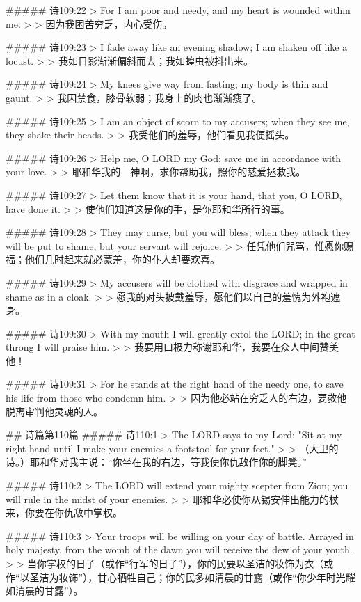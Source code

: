 ##### 诗109:22
> For I am poor and needy, and my heart is wounded within me.
>
> 因为我困苦穷乏，内心受伤。


##### 诗109:23
> I fade away like an evening shadow; I am shaken off like a locust.
>
> 我如日影渐渐偏斜而去；我如蝗虫被抖出来。


##### 诗109:24
> My knees give way from fasting; my body is thin and gaunt.
>
> 我因禁食，膝骨软弱；我身上的肉也渐渐瘦了。


##### 诗109:25
> I am an object of scorn to my accusers; when they see me, they shake their heads.
>
> 我受他们的羞辱，他们看见我便摇头。


##### 诗109:26
> Help me, O LORD my God; save me in accordance with your love.
>
> 耶和华我的　神啊，求你帮助我，照你的慈爱拯救我。


##### 诗109:27
> Let them know that it is your hand, that you, O LORD, have done it.
>
> 使他们知道这是你的手，是你耶和华所行的事。


##### 诗109:28
> They may curse, but you will bless; when they attack they will be put to shame, but your servant will rejoice.
>
> 任凭他们咒骂，惟愿你赐福；他们几时起来就必蒙羞，你的仆人却要欢喜。


##### 诗109:29
> My accusers will be clothed with disgrace and wrapped in shame as in a cloak.
>
> 愿我的对头披戴羞辱，愿他们以自己的羞愧为外袍遮身。


##### 诗109:30
> With my mouth I will greatly extol the LORD; in the great throng I will praise him.
>
> 我要用口极力称谢耶和华，我要在众人中间赞美他！


##### 诗109:31
> For he stands at the right hand of the needy one, to save his life from those who condemn him.
>
> 因为他必站在穷乏人的右边，要救他脱离审判他灵魂的人。


## 诗篇第110篇
##### 诗110:1
> The LORD says to my Lord: "Sit at my right hand until I make your enemies a footstool for your feet."
>
> （大卫的诗。）耶和华对我主说：“你坐在我的右边，等我使你仇敌作你的脚凳。”


##### 诗110:2
> The LORD will extend your mighty scepter from Zion; you will rule in the midst of your enemies.
>
> 耶和华必使你从锡安伸出能力的杖来，你要在你仇敌中掌权。


##### 诗110:3
> Your troops will be willing on your day of battle. Arrayed in holy majesty, from the womb of the dawn you will receive the dew of your youth.
>
> 当你掌权的日子（或作“行军的日子”），你的民要以圣洁的妆饰为衣（或作“以圣洁为妆饰”），甘心牺牲自己；你的民多如清晨的甘露（或作“你少年时光耀如清晨的甘露”）。


